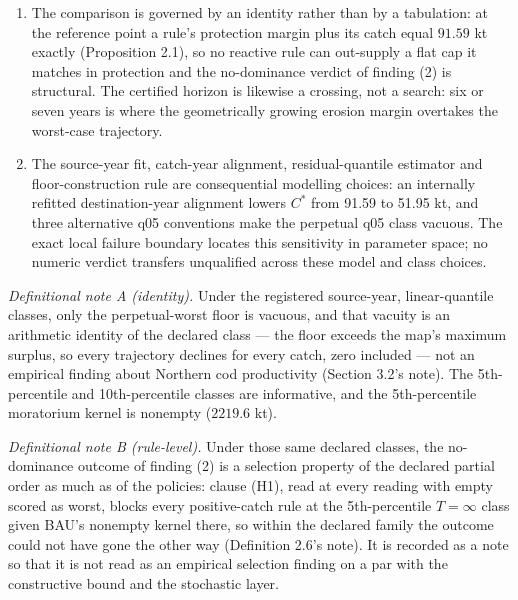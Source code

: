 \documentclass[11pt]{article}
\begin{document}
\begin{enumerate}
  The certificate has a shelf life, and it cannot be bought. The
  certified horizon is six or seven years for every declared policy and
  every constant catch from zero to \(150\) kt --- the
  moratorium included --- because the erosion margin's annual growth
  is \(379\)--\(773\) kt, four times the whole admissible catch
  range at its smallest. A review interval longer than that horizon is
  consulting an expired certificate.
\item
  The comparison is governed by an identity rather than by a tabulation:
  at the reference point a rule's protection margin plus its catch equal
  \(91.59\) kt exactly (Proposition 2.1), so no reactive rule can
  out-supply a flat cap it matches in protection and the no-dominance
  verdict of finding (2) is structural. The certified horizon is likewise
  a crossing, not a search: six or seven years is where the geometrically
  growing erosion margin overtakes the worst-case trajectory.
\item
  The source-year fit, catch-year alignment, residual-quantile estimator
  and floor-construction rule are consequential modelling choices:
  an internally refitted destination-year alignment lowers $C^*$
  from 91.59 to 51.95 kt, and three alternative q05 conventions make
  the perpetual q05 class vacuous. The exact local failure boundary
  locates this sensitivity in parameter space; no numeric verdict
  transfers unqualified across these model and class choices.
\end{enumerate}

\emph{Definitional note A (identity).} Under the registered source-year,
linear-quantile classes, only the perpetual-worst floor is vacuous, and that vacuity is an arithmetic identity of the declared
class --- the floor exceeds the map's maximum surplus, so every
trajectory declines for every catch, zero included --- not an empirical
finding about Northern cod productivity (Section 3.2's note). The
5th-percentile and 10th-percentile classes are informative, and the
5th-percentile moratorium kernel is nonempty (\(2219.6\) kt).

\emph{Definitional note B (rule-level).} Under those same declared
classes, the no-dominance outcome of finding (2) is a selection property of the declared partial order as
much as of the policies: clause (H1), read at every reading with empty
scored as worst, blocks every positive-catch rule at the 5th-percentile
\(T=\infty\) class given BAU's nonempty kernel there, so within the
declared family the outcome could not have gone the other way
(Definition 2.6's note). It is recorded as a note so that it is not read
as an empirical selection finding on a par with the constructive bound
and the stochastic layer.
\end{document}
